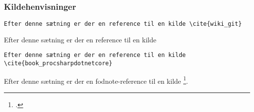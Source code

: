 \subsubsection{Kildehenvisninger}

\begin{verbatim}
Efter denne sætning er der en reference til en kilde \cite{wiki_git}
\end{verbatim}

Efter denne sætning er der en reference til en kilde \cite{wiki_git}

\begin{verbatim}
Efter denne sætning er der en reference til en kilde \cite{book_procsharpdotnetcore}
\end{verbatim}

Efter denne sætning er der en fodnote-reference til en kilde \footcite{book_procsharpdotnetcore}.

